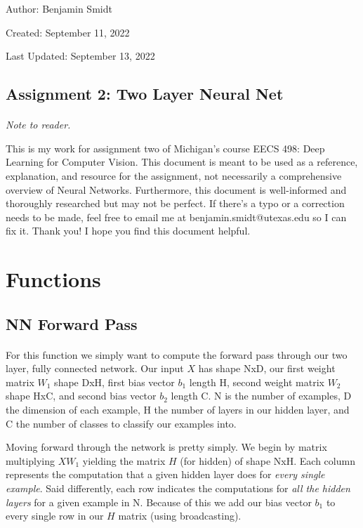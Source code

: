 \documentclass[12pt]{article}
\begin{document}
\noindent Author: Benjamin Smidt

\noindent Created: September 11, 2022

\noindent Last Updated: September 13, 2022
\begin{center}
\section*{Assignment 2: Two Layer Neural Net}
\end{center}

\paragraph{} \emph{Note to reader.} 

This is my work for assignment two of Michigan's course
EECS 498: Deep Learning for Computer Vision. This document is meant to be used as a reference, 
explanation, and resource for the assignment, not necessarily a comprehensive overview
of Neural Networks. Furthermore, this document is well-informed and thoroughly researched but
may not be perfect. If there's a typo or a correction needs to be made, feel free to 
email me at benjamin.smidt@utexas.edu so I can fix it. Thank you! I hope you find this 
document helpful.

\section{Functions} 

\subsection{NN Forward Pass}
\paragraph{}
For this function we simply want to compute the forward pass through our two layer, fully connected 
network. Our input $X$ has shape NxD, our first weight matrix $W_1$ shape DxH, first 
bias vector $b_1$ length H, second weight matrix $W_2$ shape HxC, and second bias vector
$b_2$ length C. N is the number of examples, D the dimension of each example, H the number
of layers in our hidden layer, and C the number of classes to classify our examples into. 

Moving forward through the network is pretty simply. We begin by matrix multiplying 
$XW_1$ yielding the matrix $H$ (for hidden) of shape NxH. Each column represents the computation
that a given hidden layer does for \emph{every single example}. Said differently, each row
indicates the computations for \emph{all the hidden layers} for a given example in N. 
Because of this we add our bias vector $b_1$ to every single row in our $H$ matrix
(using broadcasting). 
\end{document}
